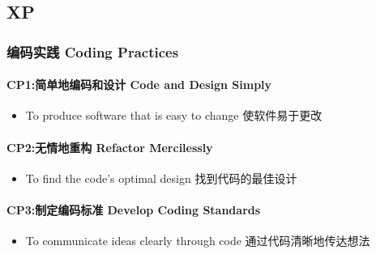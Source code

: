 \hypertarget{xp}{%
\subsection{XP}\label{xp}}

\hypertarget{ux7f16ux7801ux5b9eux8df5-coding-practices}{%
\subsubsection{编码实践 Coding
Practices}\label{ux7f16ux7801ux5b9eux8df5-coding-practices}}

\hypertarget{cp1ux7b80ux5355ux5730ux7f16ux7801ux548cux8bbeux8ba1-code-and-design-simply}{%
\paragraph{CP1:简单地编码和设计 Code and Design
Simply}\label{cp1ux7b80ux5355ux5730ux7f16ux7801ux548cux8bbeux8ba1-code-and-design-simply}}

\begin{itemize}
\tightlist
\item
  To produce software that is easy to change 使软件易于更改
\end{itemize}

\hypertarget{cp2ux65e0ux60c5ux5730ux91cdux6784-refactor-mercilessly}{%
\paragraph{CP2:无情地重构 Refactor
Mercilessly}\label{cp2ux65e0ux60c5ux5730ux91cdux6784-refactor-mercilessly}}

\begin{itemize}
\tightlist
\item
  To find the code's optimal design 找到代码的最佳设计
\end{itemize}

\hypertarget{cp3ux5236ux5b9aux7f16ux7801ux6807ux51c6-develop-coding-standards}{%
\paragraph{CP3:制定编码标准 Develop Coding
Standards}\label{cp3ux5236ux5b9aux7f16ux7801ux6807ux51c6-develop-coding-standards}}

\begin{itemize}
\tightlist
\item
  To communicate ideas clearly through code 通过代码清晰地传达想法
\end{itemize}

